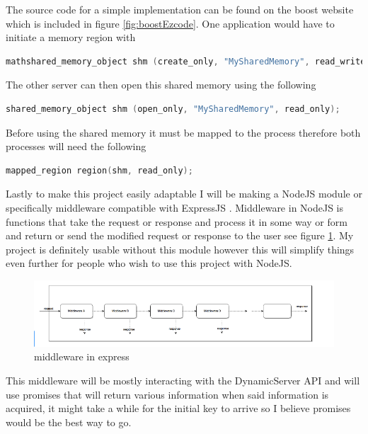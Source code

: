 The source code for a simple implementation can be found on the boost website which is included in figure \ref{fig:boostEzcode}. One application would have to initiate a memory region with 
\begin{lstlisting}[language=C] 
mathshared_memory_object shm (create_only, "MySharedMemory", read_write); 
\end{lstlisting}
The other server can then open this shared memory using the following
\begin{lstlisting}[language=C] 
shared_memory_object shm (open_only, "MySharedMemory", read_only);
\end{lstlisting}
Before using the shared memory it must be mapped to the process therefore both processes will need the following
\begin{lstlisting}[language=C] 
mapped_region region(shm, read_only);
\end{lstlisting}

Lastly to make this project easily adaptable I will be making a NodeJS module or specifically middleware compatible with ExpressJS \cite{ExpressJS}. Middleware in NodeJS is functions that take the request or response and process it in some way or form and return or send the modified request or response to the user see figure \ref{fig:middlewarebasic}. My project is definitely usable without this module however this will simplify things even further for people who wish to use this project with NodeJS. 

\begin{figure}[!h]
  \centering
      \includegraphics[width=1\textwidth]{Figures/middleware.png}
  \caption[middleware in express]{middleware in express \cite{middleware}}
  \label{fig:middlewarebasic}
\end{figure}

\FloatBarrier

This middleware will be mostly interacting with the DynamicServer API and will use promises that will return various information when said information is acquired, it might take a while for the initial key to arrive so I believe promises would be the best way to go. 

